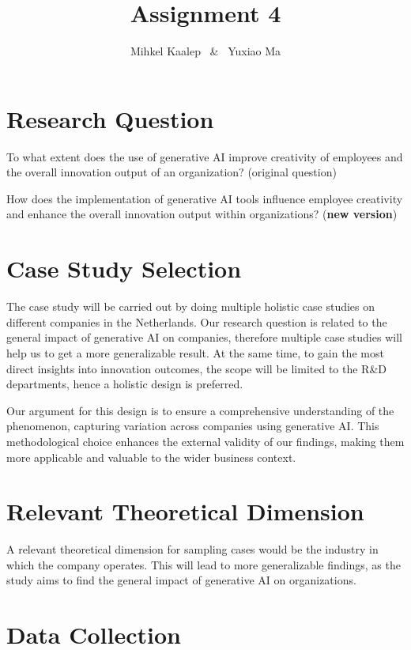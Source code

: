 \documentclass[UTF8,a4paper,AutoFakeBold,AutoFakeSlant]{article}
\title{\textbf{\textsf{{\textsf{Assignment 4}}}}}
\author{\tnewroman Mihkel Kaalep ~\&~ Yuxiao Ma}
\date{}
\begin{document}
\maketitle

\section{Research Question}

To what extent does the use of generative AI improve creativity of employees and the overall innovation output of an organization? (original question)

How does the implementation of generative AI tools influence employee creativity and enhance the overall innovation output within organizations? (\textbf{new version})


\section{Case Study Selection}

The case study will be carried out by doing multiple holistic case studies on different companies in the Netherlands. Our research question is related to the general impact of generative AI on companies, therefore multiple case studies will help us to get a more generalizable result. At the same time, to gain the most direct insights into innovation outcomes, the scope will be limited to the R\&D departments, hence a holistic design is preferred.

Our argument for this design is to ensure a comprehensive understanding of the phenomenon, capturing variation across companies using generative AI. This methodological choice enhances the external validity of our findings, making them more applicable and valuable to the wider business context.


\section{Relevant Theoretical Dimension}

A relevant theoretical dimension for sampling cases would be the industry in which the company operates. This will lead to more generalizable findings, as the study aims to find the general impact of generative AI on organizations.


\section{Data Collection}
\end{document}
